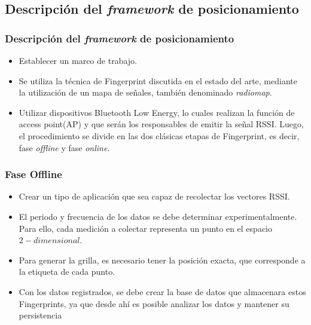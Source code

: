 \documentclass[mathserif]{beamer}
\begin{document}
\subsection{Descripción del \textit{framework} de posicionamiento}
\begin{frame}
\frametitle{Descripción del \textit{framework} de posicionamiento}

\begin{itemize}

\item Establecer un marco de trabajo.

\pause

\item Se utiliza la técnica de Fingerprint discutida en el estado del arte, mediante la utilización de un mapa de señales, también denominado \textit{radiomap}.

\pause

\item Utilizar dispositivos Bluetooth Low Energy, lo cuales realizan la función de access point(AP) y que serán los responsables de emitir la señal RSSI. Luego, el procedimiento se divide en las dos clásicas etapas de Fingerprint, es decir, fase \textit{offline} y fase \textit{online}.
\end{itemize}


\end{frame}



\begin{frame}
\frametitle{Fase Offline}

\begin{itemize}
\item Crear un tipo de aplicación que sea capaz de recolectar los vectores RSSI.

\pause

\item El periodo y frecuencia de los datos se debe determinar experimentalmente. Para ello, cada medición a colectar representa un punto en el espacio $2-dimensional$.

\pause

\item Para generar la grilla, es necesario tener la posición exacta, que corresponde a la etiqueta de cada punto.

\pause

\item Con los datos registrados, se debe crear la base de datos que almacenara estos Fingerprints, ya que desde ahí es posible analizar los datos y mantener su persistencia
\end{itemize}


\end{frame}
\end{document}
